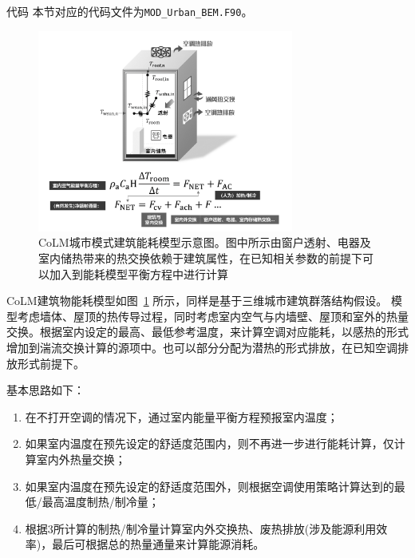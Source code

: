 \begin{mymdframed}{代码}
  本节对应的代码文件为\texttt{MOD\_Urban\_BEM.F90}。
\end{mymdframed}

{
  \begin{figure}[htbp]
    \centering
    \includegraphics[width=0.75\textwidth]{Figures/城市模式/CoLM城市模式建筑能耗示意图_v2.png}
    \caption[CoLM城市模式建筑能耗模型示意图]{CoLM城市模式建筑能耗模型示意图。图中所示由窗户透射、电器及室内储热带来的热交换依赖于建筑属性，在已知相关参数的前提下可以加入到能耗模型平衡方程中进行计算}
    \label{fig:建筑能耗模型示意图}
  \end{figure}
}

CoLM建筑物能耗模型如图~\ref{fig:建筑能耗模型示意图} 所示，同样是基于三维城市建筑群落结构假设。
模型考虑墙体、屋顶的热传导过程，同时考虑室内空气与内墙壁、屋顶和室外的热量交换。根据室内设定的最高、最低参考温度，来计算空调对应能耗，以感热的形式增加到湍流交换计算的源项中。也可以部分分配为潜热的形式排放，在已知空调排放形式前提下。

基本思路如下：

\begin{enumerate}
  \item 在不打开空调的情况下，通过室内能量平衡方程预报室内温度；
  \item 如果室内温度在预先设定的舒适度范围内，则不再进一步进行能耗计算，仅计算室内外热量交换；
  \item 如果室内温度在预先设定的舒适度范围外，则根据空调使用策略计算达到的最低/最高温度制热/制冷量；
  \item 根据3所计算的制热/制冷量计算室内外交换热、废热排放(涉及能源利用效率)，最后可根据总的热量通量来计算能源消耗。
\end{enumerate}

